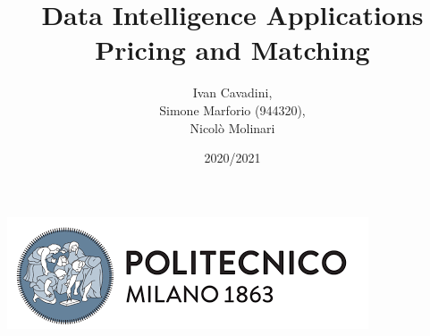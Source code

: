 \begin{titlepage}
        \title{Data Intelligence Applications\\Pricing and Matching}
		\date{2020/2021}
        \author{Ivan Cavadini,\\Simone Marforio (944320),\\Nicolò Molinari}
		\maketitle
		\begin{center}
			\includegraphics[scale=0.5]{Images/PolimiLogo}
		\end{center}
\end{titlepage}